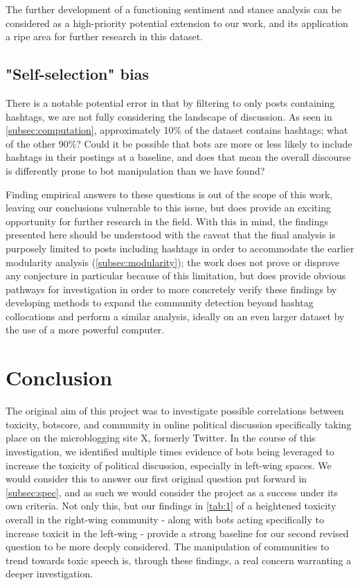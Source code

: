 \documentclass[a4paper,11pt]{article}  %
\begin{document}
	The further development of a functioning sentiment and stance analysis can be considered as a high-priority potential extension to our work, and its application a ripe area for further research in this dataset.

	\subsection{"Self-selection" bias}
	\label{subsec:bias}
	There is a notable potential error in that by filtering to only posts containing hashtags, we are not fully considering the landscape of discussion. As seen in \autoref{subsec:computation}, approximately 10\% of the dataset contains hashtags; what of the other 90\%? Could it be possible that bots are more or less likely to include hashtags in their postings at a baseline, and does that mean the overall discourse is differently prone to bot manipulation than we have found? 
	
	Finding empirical answers to these questions is out of the scope of this work, leaving our conclusions vulnerable to this issue, but does provide an exciting opportunity for further research in the field. With this in mind, the findings presented here should be understood with the caveat that the final analysis is purposely limited to posts including hashtags in order to accommodate the earlier modularity analysis (\autoref{subsec:modularity}); the work does not prove or disprove any conjecture in particular because of this limitation, but does provide obvious pathways for investigation in order to more concretely verify these findings by developing methods to expand the community detection beyond hashtag collocations and perform a similar analysis, ideally on an even larger dataset by the use of a more powerful computer.

	\section{Conclusion}
	\label{sec:conclusion}
	The original aim of this project was to investigate possible correlations between toxicity, botscore, and community in online political discussion specifically taking place on the microblogging site X, formerly Twitter. In the course of this investigation, we identified multiple times evidence of bots being leveraged to increase the toxicity of political discussion, especially in left-wing spaces. We would consider this to answer our first original question put forward in \autoref{subsec:spec}, and as such we would consider the project as a success under its own criteria. Not only this, but our findings in \autoref{tab:1} of a heightened toxicity overall in the right-wing community - along with bots acting specifically to increase toxicit in the left-wing - provide a strong baseline for our second revised question to be more deeply considered. The manipulation of communities to trend towards toxic speech is, through these findings, a real concern warranting a deeper investigation.
\end{document}
